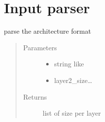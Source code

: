 \documentclass[letterpaper,10pt,english]{sphinxmanual}
\begin{document}
\chapter{Input parser}
\label{\detokenize{neuralnet/parser_callable:module-parser_callable}}\label{\detokenize{neuralnet/parser_callable:input-parser}}\label{\detokenize{neuralnet/parser_callable::doc}}

\begin{fulllineitems}
\label{\detokenize{neuralnet/parser_callable:parser_callable.get_network_architecture}}
parse the architecture format
\begin{quote}\begin{description}
\item[{Parameters}] \leavevmode\begin{itemize}
\item {} 
 \textendash{} string like

\item {} 
 \textendash{} layer2\_size…

\end{itemize}

\item[{Returns}] \leavevmode
list of size per layer

\end{description}\end{quote}

\end{fulllineitems}

\end{document}
